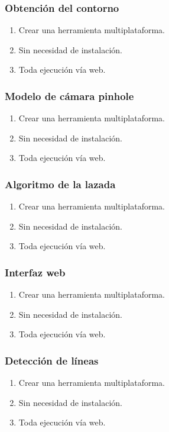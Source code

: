 \documentclass{beamer}
\begin{document}
\begin{frame}
	\frametitle{Obtención del contorno}
	\begin{enumerate}
		\item Crear una herramienta multiplataforma.
		\item Sin necesidad de instalación.
		\item Toda ejecución vía web.
	\end{enumerate}
\end{frame}

\begin{frame}
	\frametitle{Modelo de cámara pinhole}
	\begin{enumerate}
		\item Crear una herramienta multiplataforma.
		\item Sin necesidad de instalación.
		\item Toda ejecución vía web.
	\end{enumerate}
\end{frame}

\begin{frame}
	\frametitle{Algoritmo de la lazada}
	\begin{enumerate}
		\item Crear una herramienta multiplataforma.
		\item Sin necesidad de instalación.
		\item Toda ejecución vía web.
	\end{enumerate}
\end{frame}

\begin{frame}
	\frametitle{Interfaz web}
	\begin{enumerate}
		\item Crear una herramienta multiplataforma.
		\item Sin necesidad de instalación.
		\item Toda ejecución vía web.
	\end{enumerate}
\end{frame}

\begin{frame}
	\frametitle{Detección de líneas}
	\begin{enumerate}
		\item Crear una herramienta multiplataforma.
		\item Sin necesidad de instalación.
		\item Toda ejecución vía web.
	\end{enumerate}
\end{frame}
\end{document}
